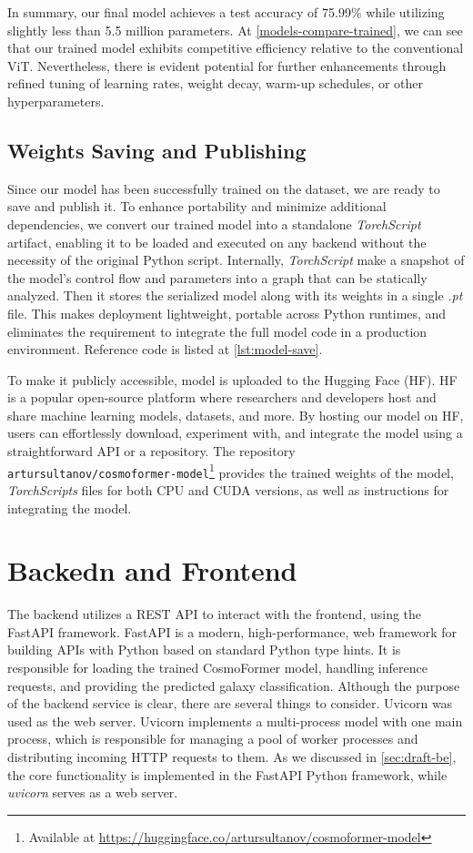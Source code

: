 In summary, our final model achieves a test accuracy of 75.99\% while utilizing slightly less than 5.5 million parameters. At \autoref{models-compare-trained}, we can see that our trained model exhibits competitive efficiency relative to the conventional ViT. Nevertheless, there is evident potential for further enhancements through refined tuning of learning rates, weight decay, warm-up schedules, or other hyperparameters.

\subsection*{Weights Saving and Publishing}

Since our model has been successfully trained on the dataset, we are ready to save and publish it. To enhance portability and minimize additional dependencies, we convert our trained model into a standalone \textit{TorchScript} artifact, enabling it to be loaded and executed on any backend without the necessity of the original Python script. Internally, \textit{TorchScript} make a snapshot of the model's control flow and parameters into a graph that can be statically analyzed. Then it stores the serialized model along with its weights in a single \textit{.pt} file. This makes deployment lightweight, portable across Python runtimes, and eliminates the requirement to integrate the full model code in a production environment. Reference code is listed at \autoref{lst:model-save}.

To make it publicly accessible, model is uploaded to the Hugging Face (HF). HF is a popular open-source platform where researchers and developers host and share machine learning models, datasets, and more. By hosting our model on HF, users can effortlessly download, experiment with, and integrate the model using a straightforward API or a repository. The repository \texttt{artursultanov/cosmoformer-model}\footnote{Available at \url{https://huggingface.co/artursultanov/cosmoformer-model}} provides the trained weights of the model, \textit{TorchScripts} files for both CPU and CUDA versions, as well as instructions for integrating the model.

\section{Backedn and Frontend}

The backend utilizes a REST API to interact with the frontend, using the FastAPI framework. FastAPI is a modern, high-performance, web framework for building APIs with Python based on standard Python type hints. It is responsible for loading the trained CosmoFormer model, handling inference requests, and providing the predicted galaxy classification. Although the purpose of the backend service is clear, there are several things to consider. Uvicorn was used as the web server. Uvicorn implements a multi-process model with one main process, which is responsible for managing a pool of worker processes and distributing incoming HTTP requests to them. As we discussed in \autoref{sec:draft-be}, the core functionality is implemented in the FastAPI Python framework, while \textit{uvicorn} serves as a web server. 

